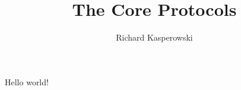 \documentclass[11pt,a4paper]{book}
\author{Richard Kasperowski }
\title{The Core Protocols}
\begin{document}
Hello world!
\end{document}
